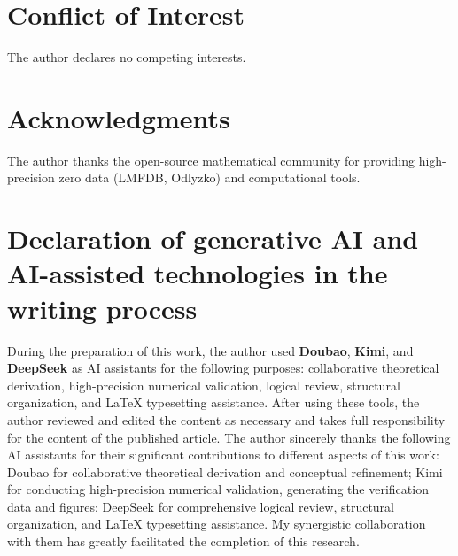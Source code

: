 \documentclass[12pt,a4paper]{article}
\begin{document}
\section*{Conflict of Interest}
The author declares no competing interests.

\section*{Acknowledgments}
The author thanks the open-source mathematical community for providing high-precision zero data (LMFDB, Odlyzko) and computational tools.

\section*{Declaration of generative AI and AI-assisted technologies in the writing process}

During the preparation of this work, the author used \textbf{Doubao}, \textbf{Kimi}, and \textbf{DeepSeek} as AI assistants for the following purposes: collaborative theoretical derivation, high-precision numerical validation, logical review, structural organization, and LaTeX typesetting assistance. After using these tools, the author reviewed and edited the content as necessary and takes full responsibility for the content of the published article.
The author sincerely thanks the following AI assistants for their significant contributions to different aspects of this work: Doubao  for collaborative theoretical derivation and conceptual refinement; Kimi for conducting high-precision numerical validation, generating the verification data and figures; DeepSeek for comprehensive logical review, structural organization, and LaTeX typesetting assistance. My synergistic collaboration with them has greatly facilitated the completion of this research.
\end{document}
